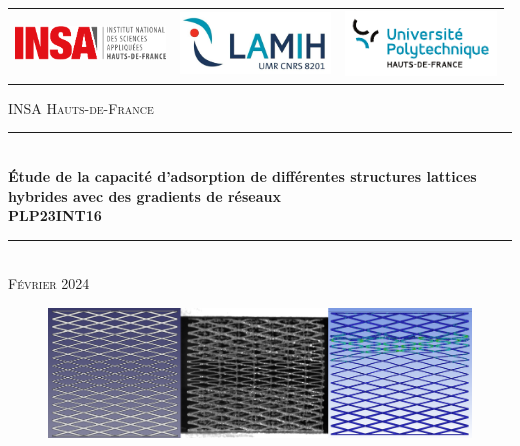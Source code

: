 \documentclass[a4paper]{article}
\begin{document}
	\begin{titlepage}
		\begin{center}
			
			\begin{table}[h]
			\centering
				\begin{tabular}{c c c}
					\includegraphics[width=4cm]{Images/Logos/logoinsa.pdf} \hspace{1.5cm} & \includegraphics[width=4cm]{Images/Logos/logolamih.png} & \hspace{1.5cm} \includegraphics[width=4cm]{Images/Logos/logouphf.pdf} \\
				\end{tabular}
			\end{table}
			\vspace{1cm}
		
			\textsc{\LARGE INSA Hauts-de-France}\\[2cm]
			
			\rule{16cm}{0.8pt}
			{\\[0,8cm] \huge \bfseries Étude de la capacité d'adsorption de différentes structures lattices hybrides avec des gradients de réseaux}\\
			\vspace{0,5cm}
			{\Large \bfseries PLP23INT16}\\[0,5cm]
			\rule{16cm}{0.8pt}
			\textsc{\\[0,5cm]Février 2024}
			\vspace{2cm}
			
			\begin{figure}[H]
				\centering
				\includegraphics[width=16.5cm]{Images/page_garde/page_garde.png}
			\end{figure}
			\vspace{3cm}
		

\end{center}
\end{titlepage}
\end{document}
